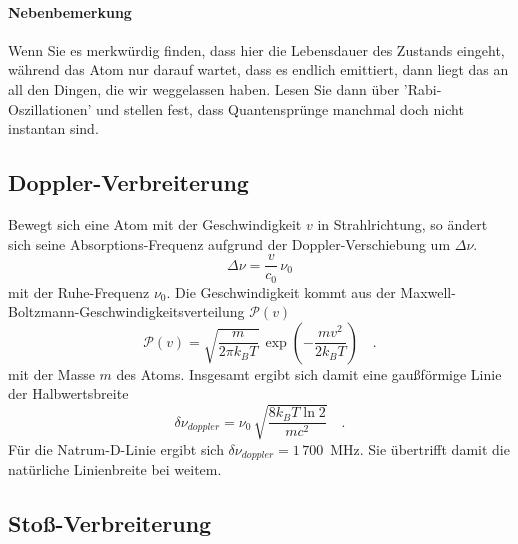 \paragraph{Nebenbemerkung} Wenn Sie es merkwürdig finden, dass hier die Lebensdauer des Zustands eingeht, während das Atom nur darauf wartet, dass es endlich emittiert, dann liegt das an all den Dingen, die wir weggelassen haben. Lesen Sie dann über  'Rabi-Oszillationen' und stellen fest, dass Quantensprünge manchmal doch nicht instantan sind.


\subsection{Doppler-Verbreiterung}


Bewegt sich eine Atom mit der Geschwindigkeit  $v$ in Strahlrichtung, so ändert sich seine Absorptions-Frequenz aufgrund der Doppler-Verschiebung um $\Delta \nu$.
\begin{equation}
	\Delta \nu = \frac{v}{c_0} \, \nu_0
\end{equation}
mit der Ruhe-Frequenz $\nu_0$. Die Geschwindigkeit kommt  aus der  Maxwell-Boltzmann-Geschwindigkeitsverteilung $\mathcal{P}(v)$
\begin{equation}
	\mathcal{P}(v) = \sqrt{\frac{m}{2 \pi k_B T}} \, \exp \left (
	- \frac{m v^2}{2  k_B T}	
	\right) \quad .
\end{equation}
mit der Masse $m$ des Atoms.
Insgesamt ergibt sich damit eine gaußförmige  Linie der Halbwertsbreite 
\begin{equation}
	 \delta \nu_{doppler} = \nu_0 \, \sqrt{\frac{8 k_B T \ln 2} {m c^2}} \quad .
\end{equation}
Für die Natrum-D-Linie ergibt sich  $\delta \nu_{doppler} = 1 \, 700$~MHz. Sie übertrifft damit die natürliche Linienbreite bei weitem.

\subsection{Stoß-Verbreiterung}

